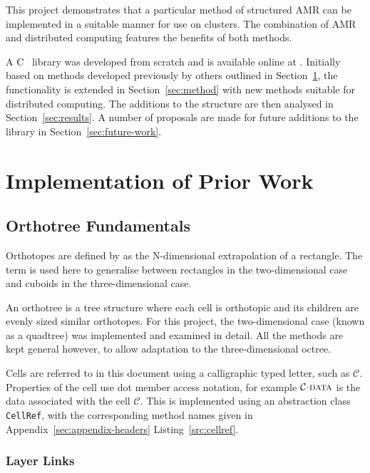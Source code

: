 \documentclass[twoside]{IIBproject}
\def\CC{{C\nolinebreak[4]\hspace{-.05em}\raisebox{.4ex}{\tiny\bf ++}}}
\newcommand{\acc}{{\mkern 0.5mu\cdot\mkern 0.5mu}}
\numberwithin{figure}{section}
\begin{document}
    This project demonstrates that a particular method of structured AMR can be implemented in a suitable manner for use on clusters. The combination of AMR and distributed computing features the benefits of both methods. 

    A \CC~ library was developed from scratch and is available online at \cite{me17}. Initially based on methods developed previously by others outlined in Section~\ref{sec:existingmethods}, the functionality is extended in Section~\ref{sec:method} with new methods suitable for distributed computing. The additions to the structure are then analysed in Section~\ref{sec:results}. A number of proposals are made for future additions to the library in Section~\ref{sec:future-work}. 


\section{Implementation of Prior Work}
    \label{sec:existingmethods}

    \subsection{Orthotree Fundamentals} %
        \label{sec:orthotree}

        Orthotopes are defined by \cite{coxeter73} as the N-dimensional extrapolation of a rectangle. The term is used here to generalise between rectangles in the two-dimensional case and cuboids in the three-dimensional case.

        An orthotree is a tree structure where each cell is orthotopic and its children are evenly sized similar orthotopes. For this project, the two-dimensional case (known as a quadtree) was implemented and examined in detail. All the methods are kept general however, to allow adaptation to the three-dimensional octree. 

        Cells are referred to in this document using a calligraphic typed letter, such as $\mathcal{C}$. Properties of the cell use dot member access notation, for example $\mathcal{C}\acc\textproc{data}$ is the data associated with the cell $\mathcal{C}$. This is implemented using an abstraction class \texttt{CellRef}, with the corresponding method names given in Appendix~\ref{sec:appendix-headers} Listing~\ref{src:cellref}.


        \subsubsection{Layer Links} %
            \label{sec:orthotree-layers}
\end{document}
